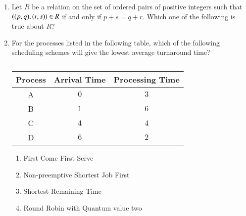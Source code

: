 \documentclass[journal,12pt,onecolumn]{IEEEtran}
\theoremstyle{remark}
\begin{document}
\begin{enumerate}
		\hfill{}
		
		\item Let $R$ be a relation on the set of ordered pairs of positive integers such that $\left((p,q), (r,s)\right) \in R$ if and only if $p + s = q + r$. Which one of the following is true about $R$?
		
		\hfill{}
		
		\begin{enumerate}
		\end{enumerate}
		
		\item For the processes listed in the following table, which of the following scheduling schemes will give the lowest average turnaround time?
		
		\begin{table}[h]
			\centering
			\caption*{}
			\label{tab:processes}
			\begin{tabular}{|c|c|c|}
				\hline
				Process & Arrival Time & Processing Time \\
				\hline
				A & $0$ & $3$ \\
				B & $1$ & $6$ \\
				C & $4$ & $4$ \\
				D & $6$ & $2$ \\
				\hline
			\end{tabular}
		\end{table}
		
		\hfill{\brak{\text{GATE CS 2015}}}
		
		\begin{enumerate}
			\item First Come First Serve
			\item Non-preemptive Shortest Job First
			\item Shortest Remaining Time
			\item Round Robin with Quantum value two
		\end{enumerate}
		
	\end{enumerate}
	

	
		
	

	
\end{document}
